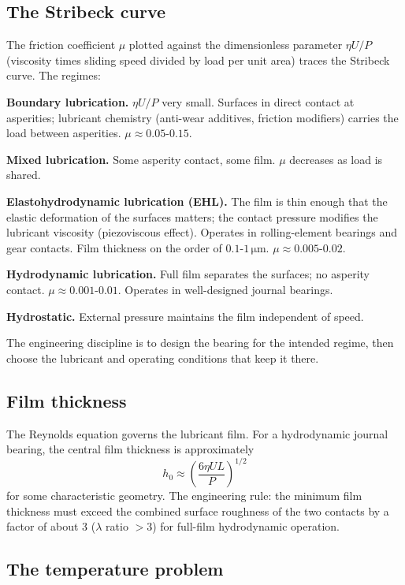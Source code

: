 \subsection{The Stribeck curve}

The friction coefficient $\mu$ plotted against the dimensionless parameter $\eta U / P$ (viscosity times sliding speed divided by load per unit area) traces the Stribeck curve. The regimes:

\textbf{Boundary lubrication.} $\eta U / P$ very small. Surfaces in direct contact at asperities; lubricant chemistry (anti-wear additives, friction modifiers) carries the load between asperities. $\mu \approx 0.05$-$0.15$.

\textbf{Mixed lubrication.} Some asperity contact, some film. $\mu$ decreases as load is shared.

\textbf{Elastohydrodynamic lubrication (EHL).} The film is thin enough that the elastic deformation of the surfaces matters; the contact pressure modifies the lubricant viscosity (piezoviscous effect). Operates in rolling-element bearings and gear contacts. Film thickness on the order of $0.1$-$1\,\si{\micro\meter}$. $\mu \approx 0.005$-$0.02$.

\textbf{Hydrodynamic lubrication.} Full film separates the surfaces; no asperity contact. $\mu \approx 0.001$-$0.01$. Operates in well-designed journal bearings.

\textbf{Hydrostatic.} External pressure maintains the film independent of speed.

The engineering discipline is to design the bearing for the intended regime, then choose the lubricant and operating conditions that keep it there.

\subsection{Film thickness}

The Reynolds equation governs the lubricant film. For a hydrodynamic journal bearing, the central film thickness is approximately
\[
h_0 \approx \left( \frac{6 \eta U L}{P} \right)^{1/2}
\]
for some characteristic geometry. The engineering rule: the minimum film thickness must exceed the combined surface roughness of the two contacts by a factor of about 3 ($\lambda$ ratio $> 3$) for full-film hydrodynamic operation.

\subsection{The temperature problem}

